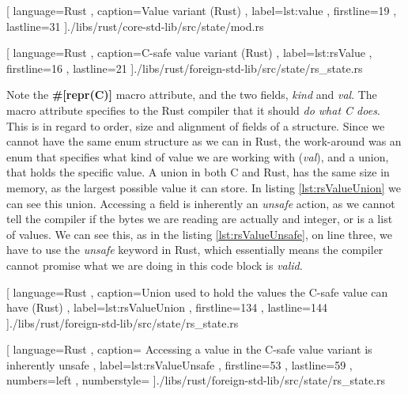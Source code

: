 \begin{code}[H]
  
    [ language=Rust
    , caption={Value variant (Rust)}
    , label=lst:value
    , firstline=19
    , lastline=31
    ]{./libs/rust/core-std-lib/src/state/mod.rs}
\end{code}

\begin{code}[H]
  
    [ language=Rust
    , caption={C-safe value variant (Rust)}
    , label=lst:rsValue
    , firstline=16
    , lastline=21
    ]{./libs/rust/foreign-std-lib/src/state/rs\_state.rs}
\end{code}

Note the \textbf{\#[repr(C)]} macro attribute, and the two fields,
\textit{kind} and \textit{val}. The macro attribute specifies to the Rust
compiler that it should \textit{do what C does}. This is in regard to order,
size and alignment of fields of a structure. Since we cannot have the same enum
structure as we can in Rust, the work-around was an enum that specifies what
kind of value we are working with (\textit{val}), and a union, that holds the
specific value. A union in both C and Rust, has the same size in memory, as the
largest possible value it can store. In listing \ref{lst:rsValueUnion} we can
see this union. Accessing a field is inherently an \textit{unsafe} action, as we
cannot tell the compiler if the bytes we are reading are actually and integer,
or is a list of values. We can see this, as in the listing
\ref{lst:rsValueUnsafe}, on line three, we have to use the \textit{unsafe}
keyword in Rust, which essentially means the compiler cannot promise what we are
doing in this code block is \textit{valid}.

\begin{code}
  
    [ language=Rust
    , caption={Union used to hold the values the C-safe value can have (Rust)}
    , label=lst:rsValueUnion
    , firstline=134
    , lastline=144
    ]{./libs/rust/foreign-std-lib/src/state/rs\_state.rs}
\end{code}

\begin{code}
  
    [ language=Rust
    , caption={
      Accessing a value in the C-safe value variant is inherently unsafe
    }
    , label=lst:rsValueUnsafe
    , firstline=53
    , lastline=59
    , numbers=left
    , numberstyle=\tiny\color{gray}
    ]{./libs/rust/foreign-std-lib/src/state/rs\_state.rs}
\end{code}

